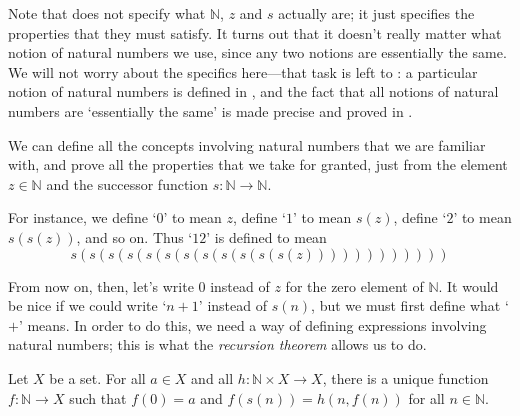 Note that  does not specify what $\mathbb{N}$, $z$ and $s$ actually are; it just specifies the properties that they must satisfy. It turns out that it doesn't really matter what notion of natural numbers we use, since any two notions are essentially the same. We will not worry about the specifics here---that task is left to : a particular notion of natural numbers is defined in , and the fact that all notions of natural numbers are `essentially the same' is made precise and proved in .

We can define all the concepts involving natural numbers that we are familiar with, and prove all the properties that we take for granted, just from the element $z \in \mathbb{N}$ and the successor function $s : \mathbb{N} \to \mathbb{N}$.

For instance, we define `$0$' to mean $z$, define `$1$' to mean $s(z)$, define `$2$' to mean $s(s(z))$, and so on. Thus `$12$' is defined to mean
\[ s(s(s(s(s(s(s(s(s(s(s(s(z)))))))))))) \]

From now on, then, let's write $0$ instead of $z$ for the zero element of $\mathbb{N}$. It would be nice if we could write `$n+1$' instead of $s(n)$, but we must first define what `$+$' means. In order to do this, we need a way of defining expressions involving natural numbers; this is what the \textit{recursion theorem} allows us to do.

\begin{theorem}
\label{thmRecursion}
Let $X$ be a set. For all $a \in X$ and all $h : \mathbb{N} \times X \to X$, there is a unique function $f : \mathbb{N} \to X$ such that $f(0) = a$ and $f(s(n)) = h(n, f(n))$ for all $n \in \mathbb{N}$.
\end{theorem}

